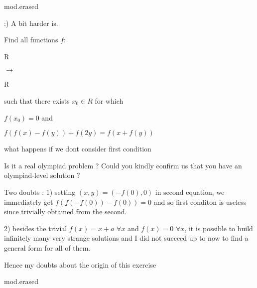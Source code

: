 \begin{solution}
	mod.erased
\end{solution}



\begin{solution}
	\begin{tcolorbox}:)  A bit harder is.

Find all functions $f:$\begin{bolded} R\end{bolded} $\rightarrow $ \begin{bolded}R \end{bolded} such that there exists $x_{0} \in R$ for which

$f(x_{0})=0$ and

$f(f(x)-f(y))+f(2y)=f(x+f(y))$

what happens if we dont consider first condition\end{tcolorbox}
Is it a real olympiad problem ?
Could you kindly confirm us that you have an olympiad-level solution ?

Two doubts :
1) setting $(x,y)=(-f(0),0)$ in second equation, we immediately get $f(f(-f(0))-f(0))=0$ and so first conditon is useless since trivially obtained from the second.

2) besides the trivial $f(x)=x+a$ $\forall x$ and $f(x)=0$ $\forall x$, it is possible to build infinitely many very strange solutions and I did not succeed up to now to find a general form for all of them.

Hence my doubts about the origin of this exercise
\end{solution}



\begin{solution}
	mod.erased
\end{solution}



